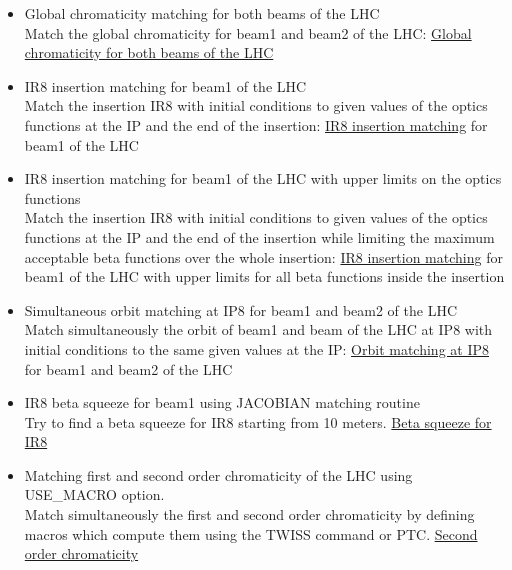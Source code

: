 \begin{itemize}
	\item Global chromaticity matching for both beams of the LHC\\
	Match the global chromaticity for beam1 and beam2 of the LHC: 
        \href{http://cern.ch/madx/madX/examples/match/lhc.2chromaticity/job.lhc.2chromaticity.madx}{Global
          chromaticity for both beams of the LHC} 
	
	\item IR8 insertion matching for beam1 of the LHC\\
	Match the insertion IR8 with initial conditions to given values
        of the optics  functions at the IP and the end of the insertion:  
        \href{http://cern.ch/madx/madX/examples/match/lhc.insertion/job.lhc.insertion.madx}{IR8
          insertion matching} for beam1 of the LHC 
	
	\item IR8 insertion matching for beam1 of the LHC with upper
          limits on the optics functions\\ 
	Match the insertion IR8 with initial conditions to given values
        of the optics  functions at the IP and the end of the insertion
        while limiting the maximum acceptable beta functions over the
        whole insertion:  
        \href{http://cern.ch/madx/madX/examples/match/lhc.insertion-upper/job.lhc.insertion-upper.madx}{IR8
          insertion matching} for beam1 of the LHC with upper limits for
        all beta functions inside the insertion 
	
	\item Simultaneous orbit matching at IP8 for beam1 and beam2 of
          the LHC\\ 
	Match simultaneously the orbit of beam1 and beam of the LHC at
        IP8  with initial conditions to the same given values at the IP:  
        \href{http://cern.ch/madx/madX/examples/match/lhc.iporbit/job.lhc.iporbit.madx}{Orbit
          matching at IP8} for beam1 and beam2 of the LHC 
	
	\item IR8 beta squeeze for beam1 using JACOBIAN matching routine\\
	Try to find a beta squeeze for IR8 starting from 10 meters. 
        \href{http://cern.ch/madx/madX/examples/match/lhcV65.ir8squeeze/job.lhcV65.ir8squeeze.madx}{Beta
          squeeze for IR8} 
	
	\item Matching first and second order chromaticity of the LHC
          using USE\_MACRO option. \\
	Match simultaneously the first and second order chromaticity by
        defining macros which compute them using the TWISS command or
        PTC.  
        \href{http://cern.ch/madx/madX/examples/match/lhc.qpp/job.lhc.qpp.madx}{Second
          order chromaticity} 
	

\end{itemize}
